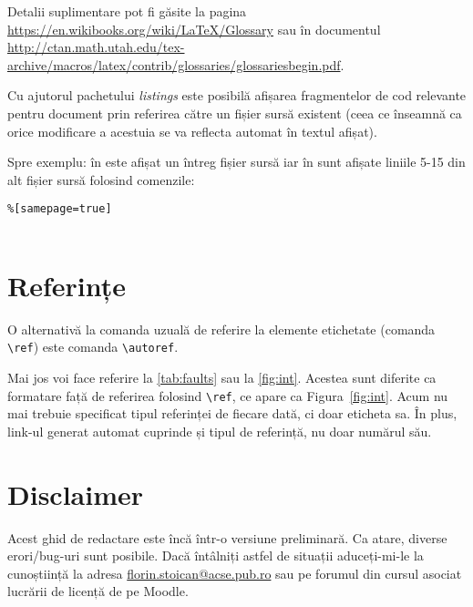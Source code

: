 \begin{description}[style=nextline]
Detalii suplimentare pot fi găsite la pagina \url{https://en.wikibooks.org/wiki/LaTeX/Glossary} sau în documentul \url{http://ctan.math.utah.edu/tex-archive/macros/latex/contrib/glossaries/glossariesbegin.pdf}.

\item[fragmente de cod] 
Cu ajutorul pachetului \emph{listings} este posibilă afișarea fragmentelor de cod relevante pentru document prin referirea către un fișier sursă existent (ceea ce înseamnă ca orice modificare a acestuia se va reflecta automat în textul afișat).

Spre exemplu:  în  este afișat un întreg fișier sursă iar în  sunt afișate liniile 5-15 din alt fișier sursă folosind comenzile:

\begin{verbatim}%[samepage=true]


\end{verbatim}

\end{description}

\section{Referințe}
O alternativă la comanda uzuală de referire la elemente etichetate (comanda \verb+\ref+) este comanda \verb+\autoref+.

Mai jos voi face referire la \autoref{tab:faults} sau la \autoref{fig:int}.
Acestea sunt diferite ca formatare față de referirea folosind \verb+\ref+, ce apare ca Figura~\ref{fig:int}.
Acum nu mai trebuie specificat tipul referinței de fiecare dată, ci doar eticheta sa.
În plus, link-ul generat automat cuprinde și tipul de referință, nu doar numărul său.

\section*{Disclaimer}

Acest ghid de redactare este încă într-o versiune preliminară. Ca atare, diverse erori/bug-uri sunt posibile. Dacă întâlniți astfel de situații aduceți-mi-le la cunoștiință la adresa \href{mailto:florin.stoican@acse.pub.ro}{florin.stoican@acse.pub.ro} sau pe forumul din cursul asociat lucrării de licență de pe Moodle.
